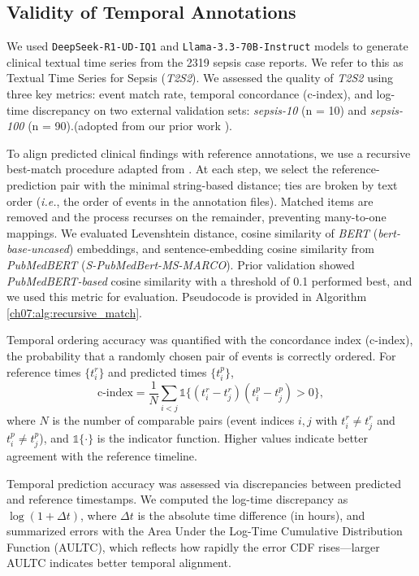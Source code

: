 \subsection{Validity of Temporal Annotations}
\label{ch07:apd:tts_validity}


We used \texttt{DeepSeek-R1-UD-IQ1} and \texttt{Llama-3.3-70B-Instruct} models to generate clinical textual time series from
the 2319 sepsis case reports.
We refer to this as Textual
Time Series for Sepsis (\textit{T2S2}).
We assessed the quality of \textit{T2S2} using three key metrics: event match rate, temporal concordance (c-index), and log-time discrepancy on two external validation sets: \textit{sepsis-10} (n = 10) and \textit{sepsis-100} (n = 90).(adopted from our prior work \cite{wang2025large}).

To align predicted clinical findings with reference annotations, we use a recursive best-match procedure adapted from \citep{wang2025large}.
At each step, we select the reference-prediction pair with the minimal string-based distance; ties are broken by text order (\emph{i.e.}, the order of events in the annotation files).
Matched items are removed and the process recurses on the remainder, preventing many-to-one mappings.
We evaluated Levenshtein distance, cosine similarity of \textit{BERT} (\textit{bert-base-uncased}) embeddings, and sentence-embedding cosine similarity from \textit{PubMedBERT} (\textit{S-PubMedBert-MS-MARCO}).
Prior validation showed \textit{PubMedBERT-based} cosine similarity with a threshold of 0.1 performed best, and we used this metric for evaluation.
Pseudocode is provided in Algorithm \ref{ch07:alg:recursive_match}.


Temporal ordering accuracy was quantified with the concordance index (c-index), the probability that a randomly chosen pair of events is correctly ordered.
For reference times $\{t^r_i\}$ and predicted times $\{t^p_i\}$,
\[
\text{c-index}=\frac{1}{N}\sum_{i<j}\mathds{1}\{(t^r_i-t^r_j)(t^p_i-t^p_j)>0\},
\]
where $N$ is the number of comparable pairs (event indices $i,j$ with $t^r_i\neq t^r_j$ and $t^p_i\neq t^p_j$), and $\mathds{1}\{\cdot\}$ is the indicator function.
Higher values indicate better agreement with the reference timeline.
 







 Temporal prediction accuracy was assessed via discrepancies between predicted and reference timestamps.
We computed the log-time discrepancy as $\log(1+\Delta t)$, where $\Delta t$ is the absolute time difference (in hours), and summarized errors with the Area Under the Log-Time Cumulative Distribution Function (AULTC), which reflects how rapidly the error CDF rises—larger AULTC indicates better temporal alignment. 


